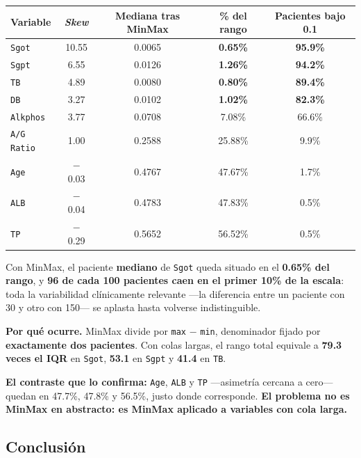 \documentclass[10pt,a4paper]{article}
\begin{document}
\begin{table}[H]
\footnotesize
\centering
\begin{tabular}{@{}lcccc@{}}
\toprule
\textbf{Variable} & \textbf{\textit{Skew}} & \textbf{Mediana tras MinMax} & \textbf{\% del rango} & \textbf{Pacientes bajo 0.1} \\
\midrule
\texttt{Sgot} & 10.55 & 0.0065 & \textbf{0.65\%} & \textbf{95.9\%} \\
\texttt{Sgpt} & 6.55 & 0.0126 & \textbf{1.26\%} & \textbf{94.2\%} \\
\texttt{TB} & 4.89 & 0.0080 & \textbf{0.80\%} & \textbf{89.4\%} \\
\texttt{DB} & 3.27 & 0.0102 & \textbf{1.02\%} & \textbf{82.3\%} \\
\texttt{Alkphos} & 3.77 & 0.0708 & 7.08\% & 66.6\% \\
\texttt{A/G Ratio} & 1.00 & 0.2588 & 25.88\% & 9.9\% \\
\texttt{Age} & $-$0.03 & 0.4767 & 47.67\% & 1.7\% \\
\texttt{ALB} & $-$0.04 & 0.4783 & 47.83\% & 0.5\% \\
\texttt{TP} & $-$0.29 & 0.5652 & 56.52\% & 0.5\% \\
\bottomrule
\end{tabular}
\end{table}

Con MinMax, el paciente \textbf{mediano} de \texttt{Sgot} queda situado en el \textbf{0.65\% del rango}, y \textbf{96 de cada 100 pacientes caen en el primer 10\% de la escala}: toda la variabilidad clínicamente relevante ---la diferencia entre un paciente con 30 y otro con 150--- se aplasta hasta volverse indistinguible.

\textbf{Por qué ocurre.} MinMax divide por \texttt{max} $-$ \texttt{min}, denominador fijado por \textbf{exactamente dos pacientes}. Con colas largas, el rango total equivale a \textbf{79.3 veces el IQR} en \texttt{Sgot}, \textbf{53.1} en \texttt{Sgpt} y \textbf{41.4} en \texttt{TB}.

\textbf{El contraste que lo confirma:} \texttt{Age}, \texttt{ALB} y \texttt{TP} ---asimetría cercana a cero--- quedan en 47.7\%, 47.8\% y 56.5\%, justo donde corresponde. \textbf{El problema no es MinMax en abstracto: es MinMax aplicado a variables con cola larga.}

\subsection{Conclusión}
\end{document}
